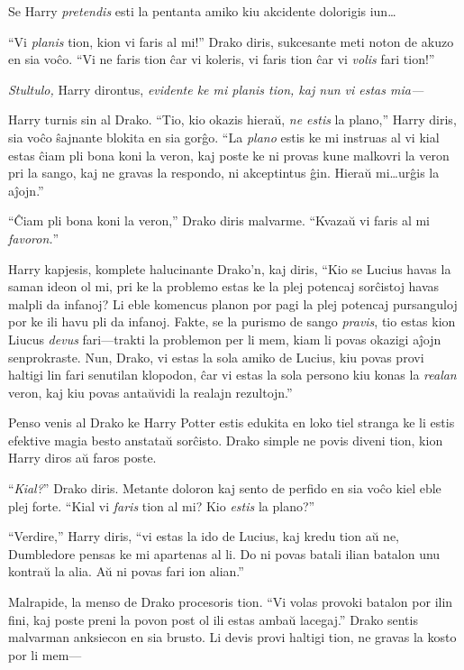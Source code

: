Se Harry \emph{pretendis} esti la pentanta amiko kiu akcidente dolorigis iun\ldots{}

``Vi \emph{planis} tion, kion vi faris al mi!'' Drako diris,
sukcesante meti noton de akuzo en sia voĉo. ``Vi ne faris tion ĉar vi
koleris, vi faris tion ĉar vi \emph{volis} fari tion!''

\emph{Stultulo,} Harry dirontus, \emph{evidente ke mi planis tion, kaj nun vi estas mia—} 

Harry turnis sin al Drako. ``Tio, kio okazis hieraŭ, \emph{ne estis}
la plano,'' Harry diris, sia voĉo ŝajnante blokita en sia gorĝo. ``La
\emph{plano} estis ke mi instruas al vi kial estas ĉiam pli bona koni
la veron, kaj poste ke ni provas kune malkovri la veron pri la sango,
kaj ne gravas la respondo, ni akceptintus ĝin. Hieraŭ mi\ldots{}urĝis
la aĵojn.''

``Ĉiam pli bona koni la veron,'' Drako diris malvarme. ``Kvazaŭ vi
faris al mi \emph{favoron.}''

Harry kapjesis, komplete halucinante Drako'n, kaj diris, ``Kio se
Lucius havas la saman ideon ol mi, pri ke la problemo estas ke la plej
potencaj sorĉistoj havas malpli da infanoj? Li eble komencus planon
por pagi la plej potencaj pursanguloj por ke ili havu pli da
infanoj. Fakte, se la purismo de sango \emph{pravis}, tio estas kion
Liucus \emph{devus} fari—trakti la problemon per li mem, kiam li povas
okazigi aĵojn senprokraste. Nun, Drako, vi estas la sola amiko de
Lucius, kiu povas provi haltigi lin fari senutilan klopodon, ĉar vi
estas la sola persono kiu konas la \emph{realan} veron, kaj kiu povas
antaŭvidi la realajn rezultojn.''

Penso venis al Drako ke Harry Potter estis edukita en loko tiel
stranga ke li estis efektive magia besto anstataŭ sorĉisto. Drako
simple ne povis diveni tion, kion Harry diros aŭ faros poste.

``\emph{Kial?}'' Drako diris. Metante doloron kaj sento de perfido en
sia voĉo kiel eble plej forte. ``Kial vi \emph{faris} tion al mi? Kio
\emph{estis} la plano?''


``Verdire,'' Harry diris, ``vi estas la ido de Lucius, kaj kredu tion
aŭ ne, Dumbledore pensas ke mi apartenas al li. Do ni povas batali
ilian batalon unu kontraŭ la alia. Aŭ ni povas fari ion alian.''

Malrapide, la menso de Drako procesoris tion. ``Vi volas provoki
batalon por ilin fini, kaj poste preni la povon post ol ili estas
ambaŭ lacegaj.'' Drako sentis malvarman anksiecon en sia brusto. Li
devis provi haltigi tion, ne gravas la kosto por li mem—

